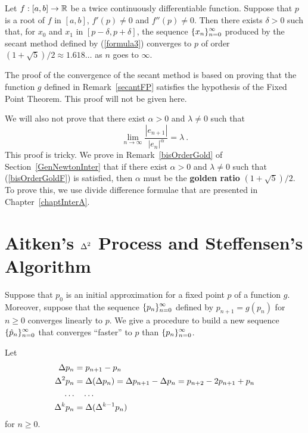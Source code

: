\begin{theorem}
Let $f:[a,b] \rightarrow \mathbb{R}$ be a twice continuously differentiable
function.  Suppose that $p$ is a root of $f$ in $[a,b]$,
$f'(p) \neq 0$ and $f''(p) \neq 0$.  Then there exists $\delta > 0$
such that, for $x_0$ and $x_1$ in $[p-\delta, p + \delta]$, the
sequence $\displaystyle \{x_n\}_{n=0}^\infty$ produced by
the secant method defined by (\ref{formula3}) converges to $p$ of order
$(1+\sqrt{5})/2 \approx 1.618\ldots$ as $n$ goes to $\infty$.
\end{theorem}

The proof of the convergence of the secant method is based on
proving that the function $g$ defined in Remark~\ref{secantFP}
satisfies the hypothesis of the Fixed Point Theorem.  This proof will
not be given here.

We will also not prove that there exist $\alpha>0$ and $\lambda \neq 0$
such that
\begin{equation} \label{bisOrderGoldF}
\lim_{n\rightarrow \infty} \frac{|e_{n+1}|}{|e_n|^\alpha} = \lambda \ .
\end{equation}
This proof is tricky.  We prove in Remark~\ref{bisOrderGold}
of Section~\ref{GenNewtonInter} that if there exist $\alpha>0$ and
$\lambda \neq 0$ such that (\ref{bisOrderGoldF}) is satisfied, then
$\alpha$ must be the {\bfseries golden ratio}
$(1+\sqrt{5})/2$.   To prove this, we use divide difference
formulae that are presented in Chapter~\ref{chaptInterA}.

\section{Aitken's $\displaystyle \Delta^2$ Process and Steffensen's Algorithm}

Suppose that $p_0$ is an initial approximation for a fixed point $p$
of a function $g$.  Moreover, suppose that the sequence
$\displaystyle \{p_n\}_{n=0}^\infty$ defined by $p_{n+1} = g(p_n)$
for $n \geq 0$ converges linearly to $p$.  We give a procedure to build a new
sequence $\displaystyle \{\hat{p}_n\}_{n=0}^\infty$ that converges
``faster'' to $p$ than $\displaystyle \{p_n\}_{n=0}^\infty$.

Let
\begin{align*}
\Delta{p_n} &= p_{n+1} - p_n\\
\Delta^{2}{p_n} &= \Delta{(\Delta{p_n})} = \Delta{p_{n+1}} - \Delta{p_n}
= p_{n+2} - 2p_{n+1} + p_n \\
\ldots &\quad \ldots \\
\Delta^{k}{p_n} &= \Delta{(\Delta^{k-1}{p_n})}
\end{align*}
for $n \geq 0$.

